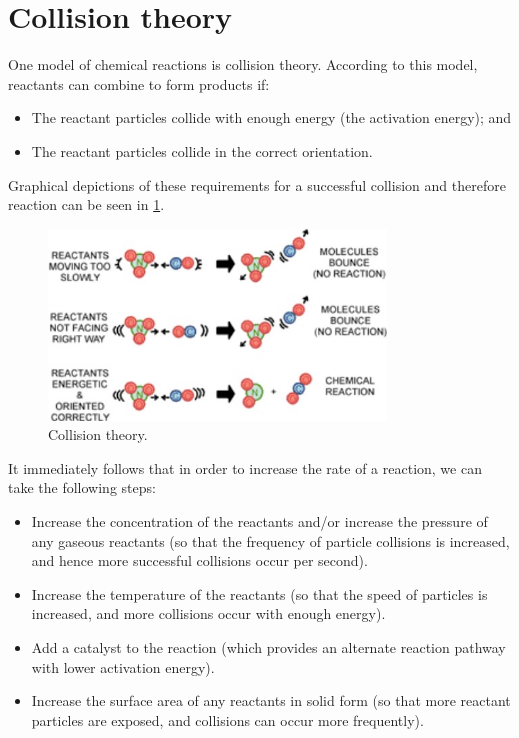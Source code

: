 \documentclass[a4paper]{memoir}
\begin{document}
\section{Collision theory}
One model of chemical reactions is collision theory. According to this model, reactants can combine to form products if:
\begin{itemize}
  \item The reactant particles collide with enough energy (the activation energy); and
  \item The reactant particles collide in the correct orientation.
\end{itemize}

Graphical depictions of these requirements for a successful collision and therefore reaction can be seen in \cref{fig:collision}.

\begin{figure}
  \centering
  \includegraphics[width=0.8\textwidth]{collision}
  \caption{Collision theory.\label{fig:collision}}
\end{figure}

It immediately follows that in order to increase the rate of a reaction, we can take the following steps:
\begin{itemize}
  \item Increase the concentration of the reactants and/or increase the pressure of any gaseous reactants (so that the frequency
        of particle collisions is increased, and hence more successful collisions occur per second).
  \item Increase the temperature of the reactants (so that the speed of particles is increased, and more collisions occur with
        enough energy).
  \item Add a catalyst to the reaction (which provides an alternate reaction pathway with lower activation energy).
  \item Increase the surface area of any reactants in solid form (so that more reactant particles are exposed, and collisions
        can occur more frequently).
\end{itemize}
\end{document}
